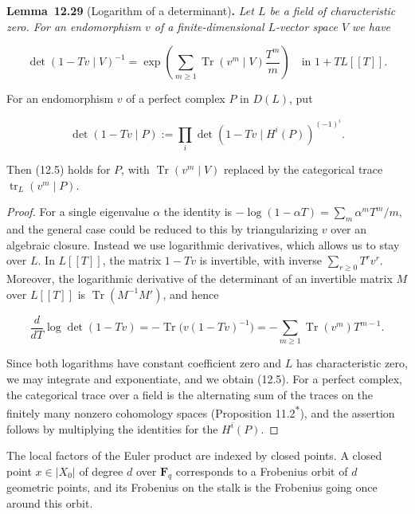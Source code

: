\documentclass[11pt]{article}
\newenvironment{bpstatement}[2]{\par\addvspace{0.6\baselineskip}\noindent\textbf{#1}#2\textbf{.}\enspace\ignorespaces}
  {\par\addvspace{0.4\baselineskip}}
\newenvironment{bpstatementit}[2]{\begin{bpstatement}{#1}{#2}\itshape\ignorespaces}{\end{bpstatement}}
\newcommand{\bpout}[1]{#1\textsuperscript{\hyperlink{bp-outside}{\ensuremath{\ast}}}}
\begin{document}
\label{bp89}%
\begin{bpstatementit}{Lemma~12.29}{ (Logarithm of a determinant)}
Let \(L\) be a field of characteristic zero. For an endomorphism \(v\) of a finite-dimensional \(L\)-vector space \(V\) we have

\[
\det(1-Tv\mid V)^{-1}
=\exp\left(\sum_{m\geq1}
\operatorname{Tr}(v^m\mid V)\frac{T^m}{m}\right)
\quad\text{in }1+TL[[T]].
\tag{12.5}
\]

For an endomorphism \(v\) of a perfect complex \(P\) in \(D(L)\), put

\[
\det(1-Tv\mid P)
:=\prod_i\det(1-Tv\mid H^i(P))^{(-1)^i}.
\]

Then (12.5) holds for \(P\), with \(\operatorname{Tr}(v^m\mid V)\) replaced by the categorical trace \(\operatorname{tr}_L(v^m\mid P)\).
\end{bpstatementit}

\begin{proof}[{Proof}]\label{bp90}%
For a single eigenvalue \(\alpha\) the identity is \(-\log(1-\alpha T)=\sum_m\alpha^mT^m/m\), and the general case could be reduced to this by triangularizing \(v\) over an algebraic closure. Instead we use logarithmic derivatives, which allows us to stay over \(L\). In \(L[[T]]\), the matrix \(1-Tv\) is invertible, with inverse \(\sum_{r\geq0}T^rv^r\). Moreover, the logarithmic derivative of the determinant of an invertible matrix \(M\) over \(L[[T]]\) is \(\operatorname{Tr}(M^{-1}M')\), and hence

\[
\frac{d}{dT}\log\det(1-Tv)
=-\operatorname{Tr}\bigl(v(1-Tv)^{-1}\bigr)
=-\sum_{m\geq1}\operatorname{Tr}(v^m)T^{m-1}.
\]

Since both logarithms have constant coefficient zero and \(L\) has characteristic zero, we may integrate and exponentiate, and we obtain (12.5). For a perfect complex, the categorical trace over a field is the alternating sum of the traces on the finitely many nonzero cohomology spaces (Proposition \bpout{11.2}), and the assertion follows by multiplying the identities for the \(H^i(P)\).
\end{proof}

\label{bp91}%
The local factors of the Euler product are indexed by closed points. A closed point \(x\in|X_0|\) of degree \(d\) over \(\mathbf F_q\) corresponds to a Frobenius orbit of \(d\) geometric points, and its Frobenius on the stalk is the Frobenius going once around this orbit.
\end{document}
